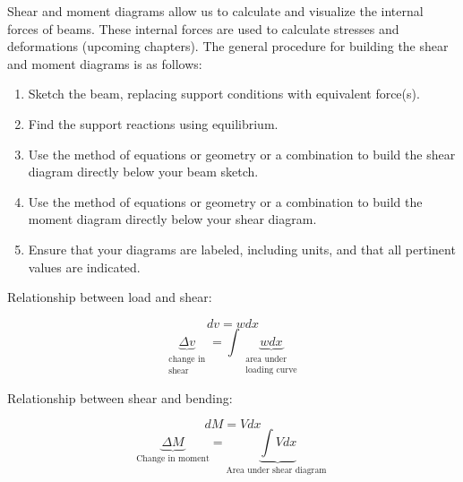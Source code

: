 \documentclass[
  letterpaper,
  DIV=11,
  numbers=noendperiod]{scrreprt}
\providecommand{\tightlist}{%
  \setlength{\itemsep}{0pt}\setlength{\parskip}{0pt}}\usepackage{longtable,booktabs,array}
\begin{document}
\begin{tcolorbox}[enhanced jigsaw, breakable, opacityback=0, toptitle=1mm, left=2mm, colback=white, opacitybacktitle=0.6, colframe=quarto-callout-note-color-frame, titlerule=0mm, arc=.35mm, leftrule=.75mm, bottomtitle=1mm, colbacktitle=quarto-callout-note-color!10!white, rightrule=.15mm, title=\textcolor{quarto-callout-note-color}{\faInfo}\hspace{0.5em}{Key takeaways}, bottomrule=.15mm, toprule=.15mm, coltitle=black]

Shear and moment diagrams allow us to calculate and visualize the
internal forces of beams. These internal forces are used to calculate
stresses and deformations (upcoming chapters). The general procedure for
building the shear and moment diagrams is as follows:

\begin{enumerate}
\def\labelenumi{\arabic{enumi}.}
\tightlist
\item
  Sketch the beam, replacing support conditions with equivalent
  force(s).
\item
  Find the support reactions using equilibrium.
\item
  Use the method of equations or geometry or a combination to build the
  shear diagram directly below your beam sketch.
\item
  Use the method of equations or geometry or a combination to build the
  moment diagram directly below your shear diagram.
\item
  Ensure that your diagrams are labeled, including units, and that all
  pertinent values are indicated.
\end{enumerate}

\end{tcolorbox}

\begin{tcolorbox}[enhanced jigsaw, breakable, opacityback=0, toptitle=1mm, left=2mm, colback=white, opacitybacktitle=0.6, colframe=quarto-callout-note-color-frame, titlerule=0mm, arc=.35mm, leftrule=.75mm, bottomtitle=1mm, colbacktitle=quarto-callout-note-color!10!white, rightrule=.15mm, title=\textcolor{quarto-callout-note-color}{\faInfo}\hspace{0.5em}{Key equations}, bottomrule=.15mm, toprule=.15mm, coltitle=black]

Relationship between load and shear:

\[
d v=w d x
\] \[
\underbrace{\Delta v}_{\substack{\text{change in} \\ \text{shear}}}=\int\underbrace{w d x}_{\substack{\text{area under} \\ \text {loading curve}}}
\]

Relationship between shear and bending:

\[
d M=V d x
\] \[
\underbrace{\Delta M}_{\text {Change in moment}}=\underbrace{\int V d x}_{\text {Area under shear diagram }}
\]

\end{tcolorbox}
\end{document}
